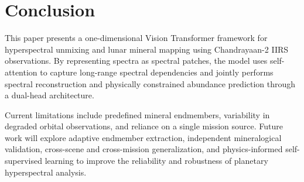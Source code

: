 \documentclass[runningheads]{llncs}
\begin{document}
\section{Conclusion}
\label{sec:conclusion}

This paper presents a one-dimensional Vision Transformer framework for
hyperspectral unmixing and lunar mineral mapping using Chandrayaan-2 IIRS
observations. By representing spectra as spectral patches, the model uses
self-attention to capture long-range spectral dependencies and jointly
performs spectral reconstruction and physically constrained abundance
prediction through a dual-head architecture.

Current
limitations include predefined mineral endmembers, variability in degraded
orbital observations, and reliance on a single mission source. Future work
will explore adaptive endmember extraction, independent mineralogical
validation, cross-scene and cross-mission generalization, and physics-informed
self-supervised learning to improve the reliability and robustness of
planetary hyperspectral analysis.
\end{document}
